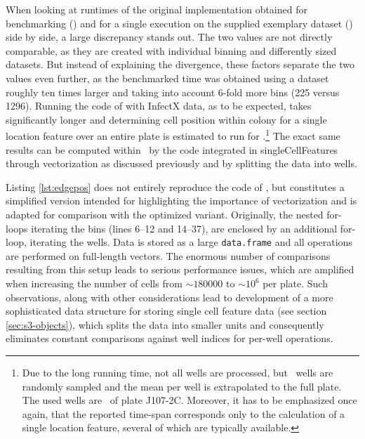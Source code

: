 
When looking at runtimes of the original implementation obtained for benchmarking (\knitrScfBenchmarkEdgeTotal) and for a single execution on the supplied exemplary dataset (\knitrScfRnaicellEdgepos) side by side, a large discrepancy stands out. The two values are not directly comparable, as they are created with individual binning and differently sized datasets. But instead of explaining the divergence, these factors separate the two values even further, as the benchmarked time was obtained using a dataset roughly ten times larger and taking into account 6-fold more bins (225 versus 1296). Running the code of \citeauthor{Knapp2011} with InfectX data, as to be expected, takes significantly longer and determining cell position within colony for a single location feature over an entire plate is estimated to run for \knitrScfFullPlateRnaicellTime.\footnote{Due to the long running time, not all wells are processed, but \knitrScfFullPlateNSamp\ wells are randomly sampled and the mean per well is extrapolated to the full plate. The used wells are \knitrScfFullPlateSampWell\ of plate J107-2C. Moreover, it has to be emphasized once again, that the reported time-span corresponds only to the calculation of a single location feature, several of which are typically available.} The exact same results can be computed within \knitrScfFullPlateMyTime\ by the code integrated in singleCellFeatures through vectorization as discussed previously and by splitting the data into wells.

Listing \ref{lst:edgepos} does not entirely reproduce the code of \citeauthor{Knapp2011}, but constitutes a simplified version intended for highlighting the importance of vectorization and is adapted for comparison with the optimized variant. Originally, the nested for-loops iterating the bins (lines 6--12 and 14--37), are enclosed by an additional for-loop, iterating the wells. Data is stored as a large \texttt{data.frame} and all operations are performed on full-length vectors. The enormous number of comparisons resulting from this setup leads to serious performance issues, which are amplified when increasing the number of cells from $\sim 180000$ to $\sim 10^6$ per plate. Such observations, along with other considerations lead to development of a more sophisticated data structure for storing single cell feature data (see section \ref{sec:s3-objects}), which splits the data into smaller units and consequently eliminates constant comparisons against well indices for per-well operations.

